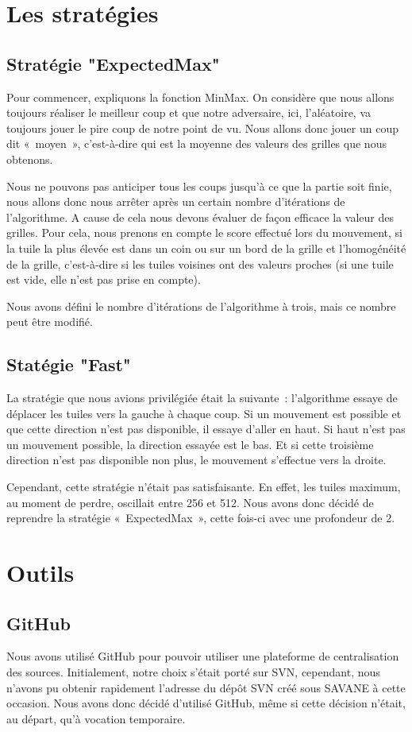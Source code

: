 \documentclass[12pt]{report}
\begin{document}
\chapter{Les stratégies}
\section{Stratégie "ExpectedMax"}
 Pour commencer, expliquons la fonction MinMax. On considère que nous allons toujours réaliser le meilleur coup et que notre adversaire, ici, l’aléatoire, va toujours jouer le pire coup de notre point de vu. Nous allons donc jouer un coup dit « moyen », c’est-à-dire qui est la moyenne des valeurs des grilles que nous obtenons.

Nous ne pouvons pas anticiper tous les coups jusqu’à ce que la partie soit finie, nous allons donc nous arrêter après un certain nombre d’itérations de l’algorithme. A cause de cela nous devons évaluer de façon efficace la valeur des grilles. Pour cela, nous prenons en compte le score effectué lors du mouvement, si la tuile la plus élevée est dans un coin ou sur un bord de la grille et l’homogénéité de la grille, c’est-à-dire si les tuiles voisines ont des valeurs proches (si une tuile est vide, elle n’est pas prise en compte).

Nous avons défini le nombre d’itérations de l’algorithme à trois, mais ce nombre peut être modifié.
\section{Statégie "Fast"}

La stratégie que nous avions privilégiée était la suivante : l’algorithme essaye de déplacer les tuiles vers la gauche à chaque coup. Si un mouvement est possible et que cette direction n’est pas disponible, il essaye d’aller en haut. Si haut n’est pas un mouvement possible, la direction essayée est le bas. Et si cette troisième direction n’est pas disponible non plus, le mouvement s’effectue vers la droite. 

Cependant, cette stratégie n’était pas satisfaisante. En effet, les tuiles maximum, au moment de perdre, oscillait entre 256 et 512. Nous avons donc décidé de reprendre la stratégie « ExpectedMax », cette fois-ci avec une profondeur de 2.

\chapter{Outils}
\section{GitHub}
Nous avons utilisé GitHub pour pouvoir utiliser une plateforme de centralisation des sources. Initialement, notre choix s’était porté sur SVN, cependant, nous n’avons pu obtenir rapidement l’adresse du dépôt SVN créé sous SAVANE à cette occasion.  Nous avons donc décidé d’utilisé GitHub, même si cette décision n’était, au départ, qu’à vocation temporaire.
\end{document}
